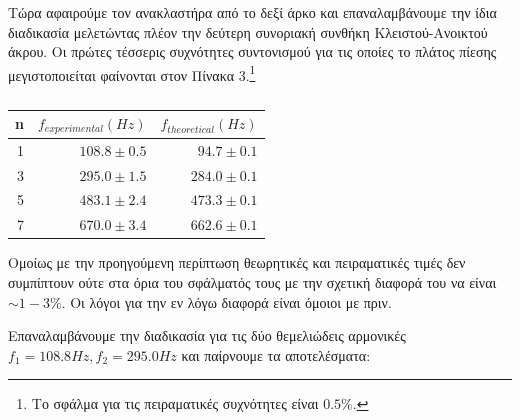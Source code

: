 \documentclass[a4paper]{article}
\begin{document}
Τώρα αφαιρούμε τον ανακλαστήρα από το δεξί άρκο και επαναλαμβάνουμε την ίδια διαδικασία μελετώντας πλέον την δεύτερη συνοριακή συνθήκη Κλειστού-Ανοικτού άκρου. Οι πρώτες τέσσερις συχνότητες συντονισμού για τις οποίες το πλάτος πίεσης μεγιστοποιείται φαίνονται στον Πίνακα 3.\footnote{Το σφάλμα για τις πειραματικές συχνότητες είναι $0.5\%$.} 
\begin{table}
\centering 
\caption{ }
\begin{tabular}{r|r|r}
n & $f_{experimental}(Hz)$ & $f_{theoretical}(Hz)$\footnotemark \\ 
\hline\hline
1 & $108.8\pm0.5$ & $94.7 \pm0.1$  \\
3 & $295.0\pm1.5$ & $284.0\pm0.1$\\
5 & $483.1\pm2.4$ & $473.3\pm0.1$ \\
7 & $670.0\pm3.4$ & $662.6\pm0.1$
\end{tabular}
\end{table}

Ομοίως με την προηγούμενη περίπτωση θεωρητικές και πειραματικές τιμές δεν συμπίπτουν ούτε στα όρια του σφάλματός τους με την σχετική διαφορά του να είναι $\sim 1-3\%$. Οι λόγοι για την εν λόγω διαφορά είναι όμοιοι με πριν. 

Επαναλαμβάνουμε την διαδικασία για τις δύο θεμελιώδεις αρμονικές $f_1=108.8Hz, f_2=295.0Hz$ και παίρνουμε τα αποτελέσματα: 


\end{document}
